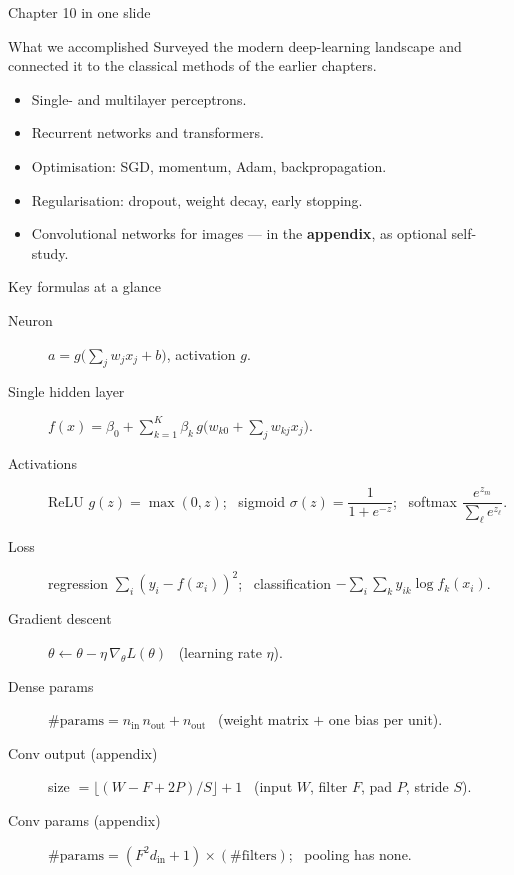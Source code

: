 \documentclass[aspectratio=169,11pt]{beamer}
\begin{document}
\begin{frame}{Chapter 10 in one slide}
  \begin{block}{What we accomplished}
    Surveyed the modern deep-learning landscape and connected it to
    the classical methods of the earlier chapters.
  \end{block}
  \begin{itemize}
    \item Single- and multilayer perceptrons.
    \item Recurrent networks and transformers.
    \item Optimisation: SGD, momentum, Adam, backpropagation.
    \item Regularisation: dropout, weight decay, early stopping.
    \item Convolutional networks for images --- in the \textbf{appendix},
          as optional self-study.
  \end{itemize}
\end{frame}

\begin{frame}{Key formulas at a glance}
  \footnotesize
  \begin{description}
    \item[Neuron] $a=g\!\big(\textstyle\sum_j w_j x_j+b\big)$, activation $g$.
    \item[Single hidden layer] $f(x)=\beta_0+\sum_{k=1}^{K}\beta_k\,g\!\big(w_{k0}+\sum_j w_{kj}x_j\big)$.
    \item[Activations] ReLU $g(z)=\max(0,z)$; \ sigmoid $\sigma(z)=\dfrac{1}{1+e^{-z}}$; \ softmax $\dfrac{e^{z_m}}{\sum_\ell e^{z_\ell}}$.
    \item[Loss] regression $\sum_i(y_i-f(x_i))^2$; \ classification $-\sum_i\sum_k y_{ik}\log f_k(x_i)$.
    \item[Gradient descent] $\theta \leftarrow \theta-\eta\,\nabla_\theta L(\theta)$ \ (learning rate $\eta$).
    \item[Dense params] $\#\text{params}=n_{\text{in}}\,n_{\text{out}}+n_{\text{out}}$ \ (weight matrix $+$ one bias per unit).
    \item[Conv output (appendix)] size $=\big\lfloor (W-F+2P)/S\big\rfloor+1$ \ (input $W$, filter $F$, pad $P$, stride $S$).
    \item[Conv params (appendix)] $\#\text{params}=(F^2 d_{\text{in}}+1)\times(\text{\#filters})$; \ pooling has none.
  \end{description}
\end{frame}
\end{document}
